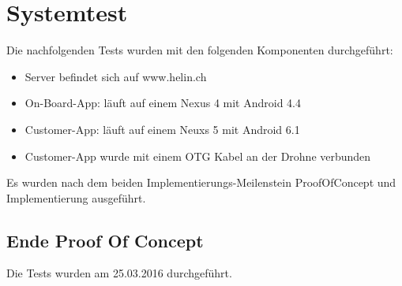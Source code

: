 \newpage
\chapter{Systemtest}

Die nachfolgenden Tests wurden mit den folgenden Komponenten durchgeführt:

\begin{itemize}
	\item Server befindet sich auf www.helin.ch
	\item On-Board-App: läuft auf einem Nexus 4 mit Android 4.4
	\item Customer-App: läuft auf einem Neuxs 5 mit Android 6.1
	\item Customer-App wurde mit einem OTG Kabel an der Drohne verbunden
\end{itemize}

Es wurden nach dem beiden Implementierungs-Meilenstein ProofOfConcept und Implementierung ausgeführt.

\section{Ende Proof Of Concept}

Die Tests wurden am 25.03.2016 durchgeführt.

